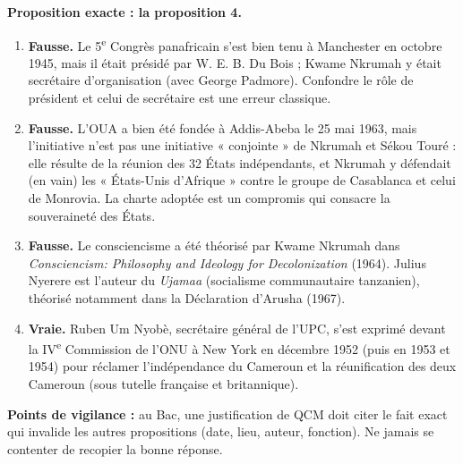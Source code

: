 \documentclass[11pt]{article}
\begin{document}
\begin{corrige}
\textbf{Proposition exacte : la proposition 4.}

\begin{enumerate}
\item \textbf{Fausse.} Le 5\textsuperscript{e} Congrès panafricain s'est bien tenu à Manchester en octobre 1945, mais il était présidé par W. E. B. Du Bois ; Kwame Nkrumah y était secrétaire d'organisation (avec George Padmore). Confondre le rôle de président et celui de secrétaire est une erreur classique.
\item \textbf{Fausse.} L'OUA a bien été fondée à Addis-Abeba le 25 mai 1963, mais l'initiative n'est pas une initiative « conjointe » de Nkrumah et Sékou Touré : elle résulte de la réunion des 32 États indépendants, et Nkrumah y défendait (en vain) les « États-Unis d'Afrique » contre le groupe de Casablanca et celui de Monrovia. La charte adoptée est un compromis qui consacre la souveraineté des États.
\item \textbf{Fausse.} Le consciencisme a été théorisé par Kwame Nkrumah dans \emph{Consciencism: Philosophy and Ideology for Decolonization} (1964). Julius Nyerere est l'auteur du \emph{Ujamaa} (socialisme communautaire tanzanien), théorisé notamment dans la Déclaration d'Arusha (1967).
\item \textbf{Vraie.} Ruben Um Nyobè, secrétaire général de l'UPC, s'est exprimé devant la IV\textsuperscript{e} Commission de l'ONU à New York en décembre 1952 (puis en 1953 et 1954) pour réclamer l'indépendance du Cameroun et la réunification des deux Cameroun (sous tutelle française et britannique).
\end{enumerate}

\textbf{Points de vigilance :} au Bac, une justification de QCM doit citer le fait exact qui invalide les autres propositions (date, lieu, auteur, fonction). Ne jamais se contenter de recopier la bonne réponse.
\end{corrige}
\end{document}
